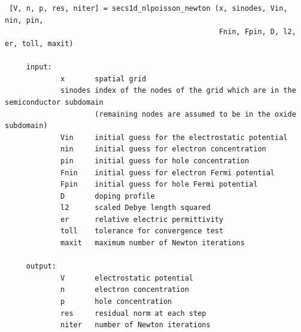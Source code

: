 \begin{verbatim}


 [V, n, p, res, niter] = secs1d_nlpoisson_newton (x, sinodes, Vin, nin, pin,
                                                  Fnin, Fpin, D, l2, er, toll, maxit)

     input:  
             x       spatial grid
             sinodes index of the nodes of the grid which are in the semiconductor subdomain
                     (remaining nodes are assumed to be in the oxide subdomain)
             Vin     initial guess for the electrostatic potential
             nin     initial guess for electron concentration
             pin     initial guess for hole concentration
             Fnin    initial guess for electron Fermi potential
             Fpin    initial guess for hole Fermi potential
             D       doping profile
             l2      scaled Debye length squared
             er      relative electric permittivity
             toll    tolerance for convergence test
             maxit   maximum number of Newton iterations

     output: 
             V       electrostatic potential
             n       electron concentration
             p       hole concentration
             res     residual norm at each step
             niter   number of Newton iterations


\end{verbatim}




